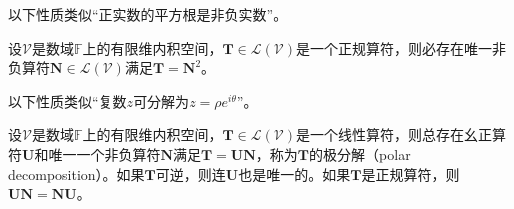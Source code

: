 \documentclass[main.tex]{subfiles}
\begin{document}
以下性质类似“正实数的平方根是非负实数”。

\begin{theorem}
设$\mathcal{V}$是数域$\mathbb{F}$上的有限维内积空间，$\mathbf{T}\in\mathcal{L}\left(\mathcal{V}\right)$是一个正规算符，则必存在唯一非负算符$\mathbf{N}\in\mathcal{L}\left(\mathcal{V}\right)$满足$\mathbf{T}=\mathbf{N}^2$。
\end{theorem}

以下性质类似“复数$z$可分解为$z=\rho e^{i\theta}$”。

\begin{theorem}
设$\mathcal{V}$是数域$\mathbb{F}$上的有限维内积空间，$\mathbf{T}\in\mathcal{L}\left(\mathcal{V}\right)$是一个线性算符，则总存在幺正算符$\mathbf{U}$和唯一一个非负算符$\mathbf{N}$满足$\mathbf{T}=\mathbf{UN}$，称为$\mathbf{T}$的极分解（polar decomposition）。如果$\mathbf{T}$可逆，则连$\mathbf{U}$也是唯一的。如果$\mathbf{T}$是正规算符，则$\mathbf{UN}=\mathbf{NU}$。
\end{theorem}
\end{document}
